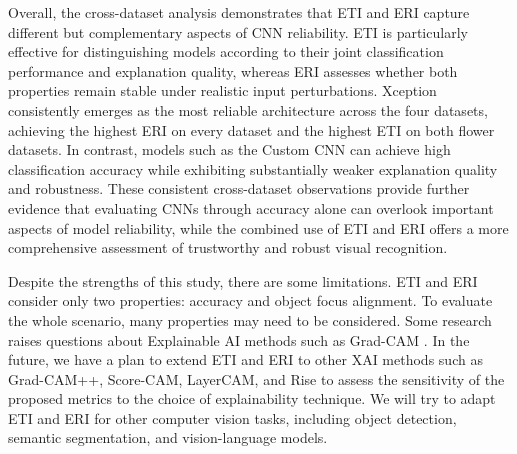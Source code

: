 \documentclass[a4paper,fleqn]{cas-dc}
\begin{document}
Overall, the cross-dataset analysis demonstrates that ETI and ERI capture different but complementary aspects of CNN reliability. ETI is particularly effective for distinguishing models according to their joint classification performance and explanation quality, whereas ERI assesses whether both properties remain stable under realistic input perturbations. Xception consistently emerges as the most reliable architecture across the four datasets, achieving the highest ERI on every dataset and the highest ETI on both flower datasets. In contrast, models such as the Custom CNN can achieve high classification accuracy while exhibiting substantially weaker explanation quality and robustness. These consistent cross-dataset observations provide further evidence that evaluating CNNs through accuracy alone can overlook important aspects of model reliability, while the combined use of ETI and ERI offers a more comprehensive assessment of trustworthy and robust visual recognition.



Despite the strengths of this study, there are some limitations. ETI and ERI consider only two properties: accuracy and object focus alignment. To evaluate the whole scenario, many properties may need to be considered. Some research raises questions about Explainable AI methods such as Grad-CAM    \cite{r102}\cite{r103}\cite{r104}. In the future, we have a plan to extend ETI and ERI to other XAI methods such as Grad-CAM++\cite{r103}, Score-CAM\cite{r105}, LayerCAM\cite{r106}, and Rise \cite{r107} to assess the sensitivity of the proposed metrics to the choice of explainability technique. We will try to adapt ETI and ERI for other computer vision tasks, including object detection, semantic segmentation, and vision-language models. 



    
\end{document}
